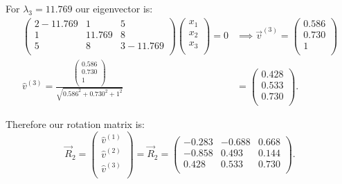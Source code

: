 \begin{derivation}
For $\lambda_3 = \num{11,769}$ our eigenvector is:
    \begin{align*}
    \begin{pmatrix}
      2 - \num{11,769}  & 1 & 5\\
    1 & \num{11,769}  & 8\\
    5 & 8 & 3 - \num{11,769} \\
    \end{pmatrix} \begin{pmatrix}
      x_1\\
    x_2\\
    x_3\\
    \end{pmatrix} = 0 &\implies \Vec{v}^{(3)} = \begin{pmatrix}
      \num{0,586} \\
    \num{0,730} \\
    1\\
    \end{pmatrix} \\
    \hat{v}^{(3)} = \frac{\begin{pmatrix}
     \num{0,586} \\
    \num{0,730} \\
    1\\
\end{pmatrix}}{\sqrt{\num{0,586} ^2 + \num{0,730} ^2 + 1^2}} &= \left(
\begin{array}{c}
\num{0.428} \\
\num{ 0.533} \\
\num{ 0.730} \\
\end{array}
\right)
.\end{align*}

Therefore our rotation matrix is:
\begin{equation*}
  \Vec{R}_2 = \begin{pmatrix}
    \hat{v}^{(1)} \\ \hat{v}^{(2)} \\ \hat{v}^{(3)}\\
  \end{pmatrix} = \Vec{R}_2 = \begin{pmatrix}
    \num{-0,283}  & \num{-0,688}  & \num{0,668} \\
  \num{-0,858}  & \num{0,493}  & \num{0,144} \\
  \num{0,428}  & \num{0,533}  & \num{0,730} \\
  \end{pmatrix}
.\end{equation*}
    

\end{derivation}
